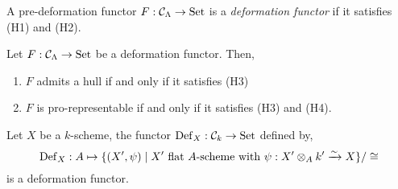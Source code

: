 \documentclass[12pt]{article}
\newcommand{\Set}{\mathrm{Set}}
\newcommand{\Def}{\mathrm{Def}}
\begin{document}
\begin{defn}
A pre-deformation functor $F : \C_{\Lambda} \to \Set$ is a \textit{deformation functor} if it satisfies (H1) and (H2).
\end{defn}

\begin{theorem}[Schlessinger]
Let $F : \C_{\Lambda} \to \Set$ be a deformation functor. Then,
\begin{enumerate}
\item $F$ admits a hull if and only if it satisfies (H3)
\item $F$ is pro-representable if and only if it satisfies (H3) and (H4).
\end{enumerate}
\end{theorem}

\begin{example}
Let $X$ be a $k$-scheme, the functor $\Def_X : \C_k \to \Set$ defined by,
\[ \Def_X : A \mapsto \{ (X', \psi) \mid X' \text{ flat } A\text{-scheme with } \psi : X' \ot_A k' \iso X \} / \cong \]
is a deformation functor. 
\end{example}
\end{document}
